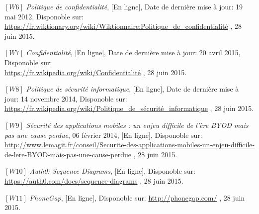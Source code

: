 \noindent $[W6]$ \hspace{2pt} \textit{Politique de confidentialité}, [En ligne], Date de dernière mise à jour: 19 mai 2012, Disponoble sur: \\
\scriptsize{\underline{https://fr.wiktionary.org/wiki/Wiktionnaire:Politique\_de\_confidentialité}} \footnotesize, 28 juin 2015.

\vspace{8pt}
\paragraphmark

\noindent $[W7]$ \hspace{2pt} \textit{Confidentialité}, [En ligne], Date de dernière mise à jour: 20 avril 2015, Disponoble sur: \\
\scriptsize{\underline{https://fr.wikipedia.org/wiki/Confidentialité}} \footnotesize, 28 juin 2015.

\vspace{8pt}
\paragraphmark

\noindent $[W8]$ \hspace{2pt} \textit{Politique de sécurité informatique}, [En ligne], Date de dernière mise à jour: 14 novembre 2014, Disponoble sur: 
\scriptsize{\underline{https://fr.wikipedia.org/wiki/Politique\_de\_sécurité\_informatique}} \footnotesize, 28 juin 2015.

\vspace{8pt}
\paragraphmark

\noindent $[W9]$ \hspace{2pt} \textit{Sécurité des applications mobiles : un enjeu difficile de l'ère BYOD mais pas une cause perdue},  06 février 2014, [En ligne], Disponoble sur: \\
\scriptsize{\underline{http://www.lemagit.fr/conseil/Securite-des-applications-mobiles-un-enjeu-difficile-de-lere-BYOD-mais-pas-une-cause-perdue}} \footnotesize, 28 juin 2015.

\vspace{8pt}
\paragraphmark

\noindent $[W10]$ \hspace{2pt} \textit{Auth0: Sequence Diagrams}, [En ligne], Disponoble sur:
\scriptsize{\underline{https://auth0.com/docs/sequence-diagrams}} \footnotesize, 28 juin 2015.


\vspace{8pt}
\paragraphmark

\noindent $[W11]$ \hspace{2pt} \textit{PhoneGap}, [En ligne], Disponoble sur:
\scriptsize{\underline{http://phonegap.com/}} \footnotesize, 28 juin 2015.

